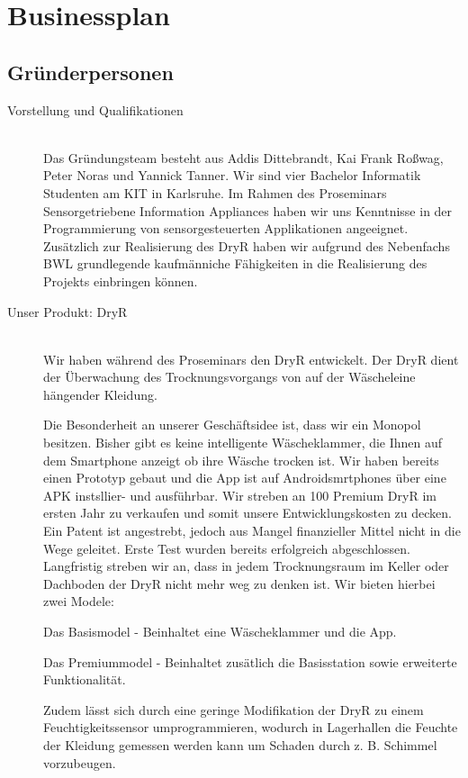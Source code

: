 \section{Businessplan}
\subsection{Gründerpersonen}
\begin{description}
	\item [Vorstellung und Qualifikationen] \hfill \\
		Das Gründungsteam besteht aus Addis Dittebrandt, Kai Frank Roßwag, Peter Noras und Yannick Tanner.
			Wir sind vier Bachelor Informatik Studenten am KIT in Karlsruhe. Im Rahmen des Proseminars Sensorgetriebene Information Appliances haben wir uns Kenntnisse in der Programmierung von sensorgesteuerten Applikationen angeeignet. Zusätzlich zur Realisierung des DryR haben wir aufgrund des Nebenfachs BWL grundlegende kaufmänniche Fähigkeiten in die Realisierung des Projekts einbringen können.
	\item [Unser Produkt: DryR] \hfill \\
		Wir haben während des Proseminars den DryR entwickelt. Der DryR dient der Überwachung des Trocknungsvorgangs von auf der Wäscheleine hängender Kleidung.

			Die Besonderheit an unserer Geschäftsidee ist, dass wir ein Monopol besitzen. Bisher gibt es keine intelligente Wäscheklammer, die Ihnen auf dem Smartphone anzeigt ob ihre Wäsche trocken ist. Wir haben bereits einen Prototyp gebaut und die App ist auf Androidsmrtphones über eine APK instsllier- und ausführbar. Wir streben an 100 Premium DryR im ersten Jahr zu verkaufen und somit unsere Entwicklungskosten zu decken. Ein Patent ist angestrebt, jedoch aus Mangel finanzieller Mittel nicht in die Wege geleitet. Erste Test wurden bereits erfolgreich abgeschlossen. Langfristig streben wir an, dass in jedem Trocknungsraum im Keller oder Dachboden der DryR nicht mehr weg zu denken ist. Wir bieten hierbei zwei Modele:

Das Basismodel - Beinhaltet eine Wäscheklammer und die App.

Das Premiummodel - Beinhaltet zusätlich die Basisstation sowie erweiterte Funktionalität.

Zudem lässt sich durch eine geringe Modifikation der DryR zu einem Feuchtigkeitssensor umprogrammieren, wodurch in Lagerhallen die Feuchte der Kleidung gemessen werden kann um Schaden durch z. B. Schimmel vorzubeugen.


\end{description}
